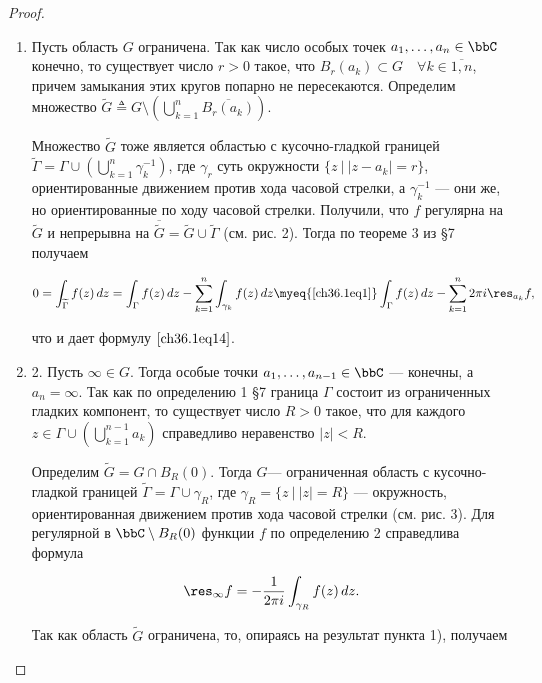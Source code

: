 \begin{proof}
\begin{enumerate}
\item Пусть область $G$ ограничена. Так как число особых точек $a_1,\ldots,a_n \in \bbC$ конечно, то существует число $r > 0$ такое, что $B_r(a_k) \subset G \quad \forall k \in \overline{1,n}$, причем замыкания этих кругов попарно не пересекаются. Определим множество $\widetilde{G} \triangleq G \setminus \left( \bigcup\limits_{k = 1}^{n} \overline{B_r(a_k)}\right)$.

Множество $\widetilde{G}$ тоже является областью с кусочно-гладкой границей $\widetilde{\Gamma} = \Gamma \cup \left( \bigcup\limits_{k = 1}^{n} \gamma_{k}^{-1} \right)$,	где $\gamma_r$ суть окружности $\{ z \: \big| \: |z - a_k| = r \}$, ориентированные движением против хода часовой стрелки, а $\gamma_{k}^{-1}$ --- они же, но ориентированные по ходу часовой стрелки. Получили, что $f$ регулярна на $\widetilde{G}$ и непрерывна на $\overline{\widetilde{G}} = \widetilde{G} \cup \widetilde{\Gamma}$ (см. рис. 2). Тогда по теореме 3 из \S 7 получаем

$$
0 = \int_{\widetilde{\Gamma}} f(z) \,dz = \int_{\Gamma} f(z) \,dz - \sum_{k = 1}^{n} \int_{\gamma_k} f(z) \,dz \myeq{\eqref{ch36.1eq1}} \int_{\Gamma} f(z) \,dz - \sum_{k = 1}^{n} 2\pi i \res_{a_k} f,
$$

что и дает формулу $\eqref{ch36.1eq14}$.


\item 2.	Пусть $\infty \in G$. Тогда особые точки $a_1,\ldots,a_{n - 1} \in \bbC$ --- конечны, а $a_n = \infty$. Так как по определению 1 \S 7 граница $\Gamma$ состоит из ограниченных гладких компонент, то существует число $R > 0$ такое, что для каждого $z \in \Gamma \cup \left( \bigcup\limits_{k = 1}^{n - 1} a_k \right)$ справедливо неравенство $|z| < R$.

Определим $\widetilde{G} = G \cap B_R(0)$. Тогда $G$— ограниченная область с кусочно-гладкой границей $\widetilde{\Gamma} = \Gamma \cup \gamma_R$, где $\gamma_R = \{ z \: \big| \: |z| = R\}$ --- окружность, ориентированная движением против хода часовой стрелки (см. рис. 3). Для регулярной в $\bbC \setminus B_R(0)$ функции $f$ по определению 2 справедлива формула

\begin{equation} \label{ch36.1eq15}
\res_{\infty} f = - \frac{1}{2\pi i} \int_{\gamma_R} f(z) \,dz.
\end{equation}


Так как область $\widetilde{G}$ ограничена, то, опираясь на результат пункта 1), получаем


\end{enumerate}
\end{proof}
